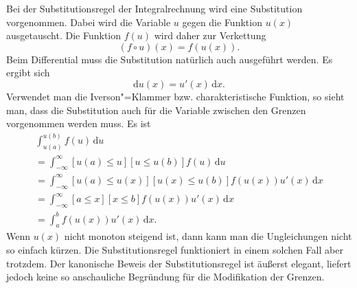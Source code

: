 \documentclass[a4paper,10pt,fleqn,twocolumn,twoside]{article}
\numberwithin{equation}{section}
\begin{document}
Bei der Substitutionsregel der Integralrechnung wird eine
Substitution vorgenommen. Dabei wird die Variable $u$ gegen die Funktion
$u(x)$ ausgetauscht. Die Funktion $f(u)$ wird daher zur
Verkettung
\begin{equation}
(f\circ u)(x) = f(u(x)).
\end{equation}
Beim Differential muss die Substitution natürlich auch ausgeführt
werden. Es ergibt sich
\begin{equation}
\mathrm du(x) = u'(x)\,\mathrm dx.
\end{equation}
Verwendet man die Iverson"=Klammer bzw. charakteristische Funktion,
so sieht man, dass die Substitution auch für die Variable zwischen
den Grenzen vorgenommen werden muss. Es ist
\begin{gather*}
\int_{u(a)}^{u(b)} f(u)\,\mathrm du\\
= \int_{-\infty}^{\infty} [u(a)\le u][u\le u(b)] f(u)\,\mathrm du\\
= \int_{-\infty}^{\infty} [u(a)\le u(x)][u(x) \le u(b)] f(u(x))u'(x)\,\mathrm dx\\
= \int_{-\infty}^{\infty} [a\le x][x\le b] f(u(x)) u'(x)\,\mathrm dx\\
= \int_a^b f(u(x))u'(x)\,\mathrm dx.
\end{gather*}
Wenn $u(x)$ nicht monoton steigend ist, dann kann man die
Ungleichungen nicht so einfach kürzen. Die Substitutionsregel
funktioniert in einem solchen Fall aber trotzdem. Der kanonische
Beweis der Substitutionsregel ist äußerst elegant, liefert jedoch
keine so anschauliche Begründung für die Modifikation der Grenzen.
\end{document}
